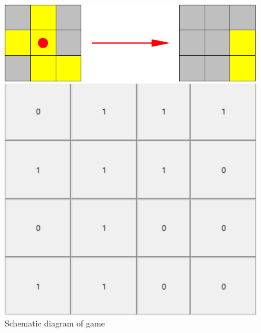 \documentclass[
  manuscript=article,  %
  layout=preprint,  %
  year=20xx,
  volume=x,
]{extra/joas}
\begin{document}
\begin{figure}[ht!]
  \centering
  \begin{minipage}{0.25\textwidth}
    \centering
    \includegraphics[width=\linewidth]{./flip game/1.eps}
    \caption{Schematic diagram of game}
  \end{minipage}
  \hfill
  \begin{minipage}{0.25\textwidth}
    \centering
    \includegraphics[width=\linewidth]{./flip game/2.png}
  \end{minipage}
  \hfill
  \begin{minipage}{0.25\textwidth}
    \centering

\end{minipage}
\end{figure}
\end{document}
